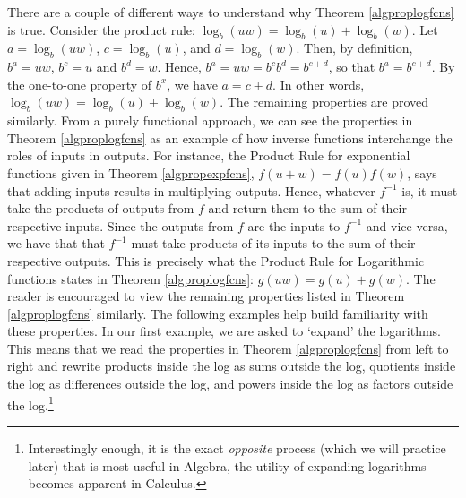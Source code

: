 \smallskip

There are a couple of different ways to understand why Theorem \ref{algproplogfcns} is true.  Consider the product rule: $\log_{b}(uw) = \log_{b}(u) + \log_{b}(w)$.  Let $a = \log_{b}(uw)$, $c = \log_{b}(u)$, and $d = \log_{b}(w)$.  Then, by definition, $b^{a} = uw$, $b^{c} = u$ and $b^{d} = w$.  Hence, $b^{a} = uw = b^{c} b^{d} = b^{c+d}$, so that $b^{a} = b^{c+d}$.  By the one-to-one property of $b^{x}$, we have $a = c+d$. In other words, $\log_{b}(uw) = \log_{b}(u) + \log_{b}(w)$.  The remaining properties are proved similarly.  From a purely functional approach, we can see the properties in Theorem \ref{algproplogfcns} as an example of how inverse functions interchange the roles of inputs in outputs.  For instance, the Product Rule for exponential functions given in Theorem  \ref{algpropexpfcns}, $f(u+w) = f(u)f(w)$, says that adding inputs results in multiplying outputs.  Hence, whatever $f^{-1}$ is, it must take the products of outputs from $f$ and return them to the sum of their respective inputs.  Since the outputs from $f$ are the inputs to $f^{-1}$ and vice-versa, we have that that $f^{-1}$ must take products of its inputs to the sum of their respective outputs. This is precisely what the Product Rule for Logarithmic functions states in Theorem \ref{algproplogfcns}:  $g(uw) = g(u) + g(w)$.  The reader is encouraged to view the remaining properties listed in Theorem \ref{algproplogfcns} similarly.  The following examples help build familiarity with these properties.  In our first example, we are asked to `expand' the logarithms.  This means that we read the properties in Theorem \ref{algproplogfcns} from left to right and rewrite products inside the log as sums outside the log, quotients inside the log as  differences outside the log, and powers inside the log as factors outside the log.\footnote{Interestingly enough, it is the exact \textit{opposite} process (which we will practice later) that is most useful in Algebra, the utility of expanding logarithms becomes apparent in Calculus.}

\smallskip


